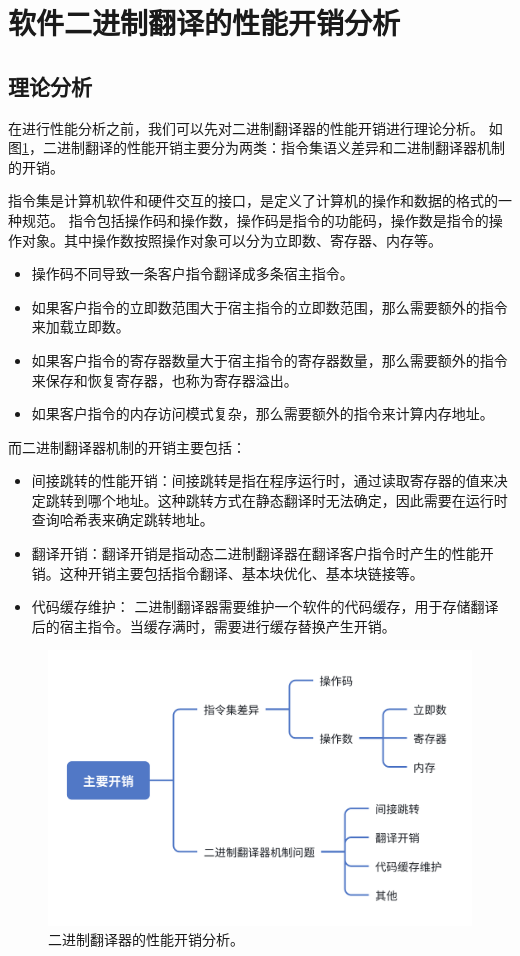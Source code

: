 \section{软件二进制翻译的性能开销分析}\label{sec:bt_overhead_all}

\subsection{理论分析}\label{sec:bt_overhead}

在进行性能分析之前，我们可以先对二进制翻译器的性能开销进行理论分析。
如图\ref{img:bt_overhead}，二进制翻译的性能开销主要分为两类：指令集语义差异和二进制翻译器机制的开销。

指令集是计算机软件和硬件交互的接口，是定义了计算机的操作和数据的格式的一种规范。
指令包括操作码和操作数，操作码是指令的功能码，操作数是指令的操作对象。其中操作数按照操作对象可以分为立即数、寄存器、内存等。
\begin{itemize}
\item 操作码不同导致一条客户指令翻译成多条宿主指令。
\item 如果客户指令的立即数范围大于宿主指令的立即数范围，那么需要额外的指令来加载立即数。
\item 如果客户指令的寄存器数量大于宿主指令的寄存器数量，那么需要额外的指令来保存和恢复寄存器，也称为寄存器溢出。
\item 如果客户指令的内存访问模式复杂，那么需要额外的指令来计算内存地址。
\end{itemize}

而二进制翻译器机制的开销主要包括：
\begin{itemize}
\item 间接跳转的性能开销：间接跳转是指在程序运行时，通过读取寄存器的值来决定跳转到哪个地址。这种跳转方式在静态翻译时无法确定，因此需要在运行时查询哈希表来确定跳转地址。
\item 翻译开销：翻译开销是指动态二进制翻译器在翻译客户指令时产生的性能开销。这种开销主要包括指令翻译、基本块优化、基本块链接等。
\item 代码缓存维护： 二进制翻译器需要维护一个软件的代码缓存，用于存储翻译后的宿主指令。当缓存满时，需要进行缓存替换产生开销。
\end{itemize}


\begin{figure}[!htbp]
  \centering
  \includegraphics[width=0.7\linewidth]{./feishuImage/overhead.png}
  \caption{二进制翻译器的性能开销分析。}
  \label{img:bt_overhead}
\end{figure}


